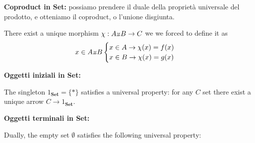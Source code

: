\documentclass[a4paper]{article}
\begin{document}
\newcommand{\invPi}{\rotatebox[origin=c]{180}{$\pi$}}

\textbf{Coproduct in Set:}
possiamo prendere il duale della proprietà universale
del prodotto, e otteniamo il coproduct, o l'unione disgiunta.
\begin{center}
\end{center}
There exist a unique morphism \(\chi: A \invPi B \to C\)
we we forced to define it as
\[
    x \in A \invPi B \begin{cases}
        x \in A \rightarrow \chi(x) = f(x) \\
        x \in B \rightarrow \chi(x) = g(x) \\
    \end{cases}
\]

\textbf{Oggetti iniziali in Set:}

The singleton \(1_\mathbf{Set} = \{\ast\}\) satisfies a universal property:
for any \(C\) set there exist a unique arrow \(C \to 1_\mathbf{Set}\).
\begin{center}
\end{center}

\textbf{Oggetti terminali in Set:}

Dually, the empty set \(\emptyset\) satisfies the following universal property:
\begin{center}
\end{center}
\end{document}
